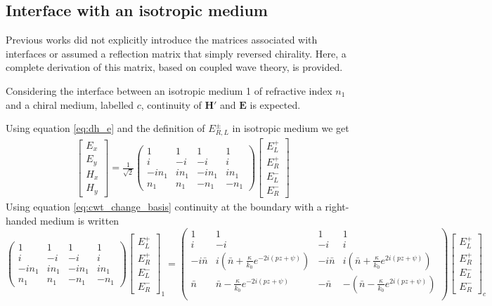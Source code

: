 \subsection{Interface with an isotropic medium}
\label{sec:interface_iso}
Previous works\cite{mccall_properties_2009} did not explicitly introduce the matrices associated with interfaces or assumed a reflection matrix that simply reversed chirality. Here, a complete derivation of this matrix, based on coupled wave theory, is provided. 

Considering the interface between an isotropic medium 1 of refractive index $n_1$ and a chiral medium, labelled $c$, continuity of $\bm{H'}$ and $\bm{E}$ is expected.

Using equation \ref{eq:dh_e} and the definition of $E^\pm_{R,L}$ in isotropic medium we get
\begin{eqnarray}
\begin{bmatrix}
E_x\\E_y\\H_x\\H_y
\end{bmatrix} = \frac{1}{\sqrt{2}}\begin{pmatrix}
1 & 1 & 1 & 1\\
i & -i & -i & i\\
-in_1 & in_1 & -in_1 & in_1\\
n_1 & n_1 & -n_1 & -n_1
\end{pmatrix}\begin{bmatrix}
E_L^+\\E_R^+\\E_L^-\\E_R^-
\end{bmatrix}
\end{eqnarray}
Using equation \ref{eq:cwt_change_basis} continuity at the boundary with a right-handed medium is written
\begin{equation}
\begin{pmatrix}
1 & 1 & 1 & 1\\
i & -i & -i & i\\
-in_1 & in_1 & -in_1 & in_1\\
n_1 & n_1 & -n_1 & -n_1
\end{pmatrix}\begin{bmatrix}
E_L^+\\E_R^+\\E_L^-\\E_R^-
\end{bmatrix}_1 = \begin{pmatrix}
1 & 1 & 1 & 1\\
i &-i &-i & i\\
-i\bar{n} & i(\bar{n}+\frac{\kappa}{k_0}e^{-2i(pz+\psi)}) & -i\bar{n} & i(\bar{n}+\frac{\kappa}{k_0} e^{2i(pz+\psi)}) \\
\bar{n} & \bar{n}-\frac{\kappa}{k_0} e^{-2i(pz+\psi)} & -\bar{n} & -(\bar{n}-\frac{\kappa}{k_0} e^{2i(pz+\psi)}) \\
\end{pmatrix}\begin{bmatrix}
E_L^+\\E_R^+\\E_L^-\\E_R^-
\end{bmatrix}_c
\end{equation}
